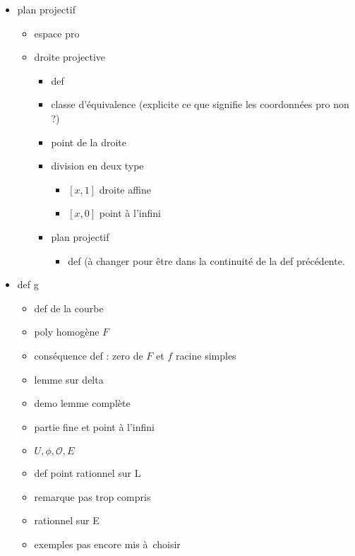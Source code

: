 \begin{itemize}
    \item plan projectif
        \begin{itemize}
            \item espace pro
            \item droite projective
                \begin{itemize}
                    \item def
                    \item classe d'équivalence (explicite ce que signifie les coordonnées pro
                        non ?)
                    \item point de la droite
                    \item division en deux type
                        \begin{itemize}
                            \item $[x,1]$ droite affine
                            \item $[x,0]$ point à l'infini
                        \end{itemize}
                    \item plan projectif
                        \begin{itemize}
                            \item def (à changer pour être dans la continuité de la def
                                précédente.
                        \end{itemize}
                \end{itemize}
        \end{itemize}
    \item def g
        \begin{itemize}
            \item def de la courbe
            \item poly homogène $F$
            \item conséquence def : zero de $F$ et $f$ racine simples
            \item lemme sur delta
            \item demo lemme complète
            \item partie fine et point à l'infini
            \item $U,\phi,\mathcal{O},E$
            \item def point rationnel sur L
            \item remarque pas trop compris
            \item rationnel sur E
            \item exemples pas encore mis à choisir

\end{itemize}
\end{itemize}
